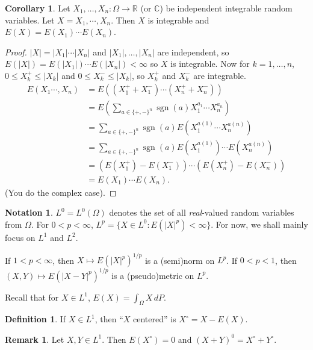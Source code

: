 \documentclass{article}
\newcommand{\C}{\mathbb{C}}
\newcommand{\R}{\mathbb{R}}
\DeclareMathOperator{\sgn}{sgn}
\theoremstyle{definition}
\newtheorem{corollary}[theorem]{Corollary}
\newtheorem*{definition}{Definition}
\newtheorem*{remark}{Remark}
\newtheorem*{notation}{Notation}
\begin{document}
\begin{corollary}
    Let $X_1, \dots, X_n: \Omega \longrightarrow \R$ (or $\C$) be independent integrable random variables. Let $X = X_1, \cdots, X_n$. Then $X$ is integrable and $E(X) = E(X_1) \cdots E(X_n)$.
\end{corollary}
\begin{proof}
    $|X| = |X_1| \cdots |X_n|$ and $|X_1|, \dots, |X_n|$ are independent, so $E(|X|) = E(|X_1|) \cdots E(|X_n|) < \infty$ so $X$ is integrable. Now for $k = 1, \dots, n$, $0 \leq X_k^+ \leq |X_k|$ and $0 \leq X_k^- \leq |X_k|$, so $X_k^+$ and $X_k^-$ are integrable.
    \begin{align*}
        E(X_1 \cdots, X_n) &= E((X_1^+ + X_1^-) \cdots (X_n^+ + X_n^-)) \\
        &= E\left(\sum_{a \in \{+, -\}^n} \sgn(a) X_1^{a_1} \cdots X_n^{a_n} \right) \\
        &= \sum_{a \in \{+, -\}^n} \sgn(a) E(X_1^{a(1)} \cdots X_n^{a(n)}) \\
        &= \sum_{a \in \{+, -\}^n} \sgn(a) E(X_1^{a(1)}) \cdots E(X_n^{a(n)}) \\
        &= (E(X_1^+)-E(X_1^-)) \cdots (E(X_n^+)-E(X_n^-)) \\
        &= E(X_1) \cdots E(X_n).
    \end{align*}
    (You do the complex case).
\end{proof}

\begin{notation}
$L^0 = L^0(\Omega)$ denotes the set of all \emph{real}-valued random variables from $\Omega$. For $0 < p < \infty$, $L^p = \{ X \in L^0 : E(|X|^p) < \infty\}$. For now, we shall mainly focus on $L^1$ and $L^2$. %

If $1 < p < \infty$, then $X \mapsto E(|X|^p)^{1/p}$ is a (semi)norm on $L^p$. If $0 < p < 1$, then $(X, Y) \mapsto E(|X-Y|^p)^{1/p}$ is a (pseudo)metric on $L^p$.

Recall that for $X \in L^1$, $E(X) = \int_\Omega X\,dP$.
\end{notation}

\begin{definition}
    If $X \in L^1$, then ``$X$ centered'' is $X^\circ = X - E(X)$.
\end{definition}

\begin{remark}
     Let $X, Y \in L^1$. Then $E(X^\circ) = 0$ and $(X+Y)^0 = X^\circ + Y^\circ$.
\end{remark}
\end{document}
